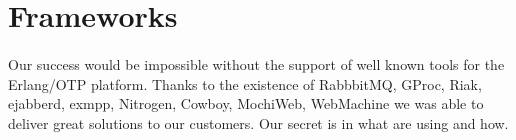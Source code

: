 \documentclass[11pt]{article}
\begin{document}

\section*{Frameworks}
\paragraph{}
Our success would be impossible without the support of well known tools for the Erlang/OTP platform.
Thanks to the existence of RabbbitMQ, GProc, Riak, ejabberd, exmpp, Nitrogen, Cowboy, MochiWeb,
WebMachine we was able to deliver great solutions to our customers. Our secret is in what are using and how.



\end{document}
